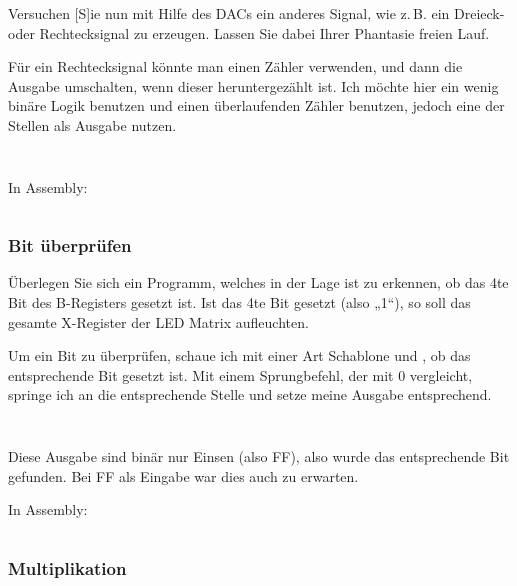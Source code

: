\begin{problem}
	Versuchen [S]ie nun mit Hilfe des DACs ein anderes Signal, wie z.\,B. ein
	Dreieck- oder Rechtecksignal zu erzeugen. Lassen Sie dabei Ihrer Phantasie
	freien Lauf.
\end{problem}

Für ein Rechtecksignal könnte man einen Zähler verwenden, und dann die Ausgabe
umschalten, wenn dieser heruntergezählt ist. Ich möchte hier ein wenig binäre
Logik benutzen und einen überlaufenden Zähler benutzen, jedoch eine der Stellen
als Ausgabe nutzen.

\inputminted[fontsize=\small, linenos]{cpp}{../Prototypen/e.cpp}

\begin{multicols}{9}
	\inputminted[fontsize=\footnotesize]{text}{e.txt}
\end{multicols}

In Assembly:

\inputminted[fontsize=\small, linenos]{python}{../Assembly/e.s}

\subsubsection{Bit überprüfen}

\begin{problem}
	Überlegen Sie sich ein Programm, welches in der Lage ist zu erkennen, ob
	das 4te Bit des B-Registers gesetzt ist. Ist das 4te Bit gesetzt (also
	„1“), so soll das gesamte X-Register der LED Matrix aufleuchten.
\end{problem}

Um ein Bit zu überprüfen, schaue ich mit einer Art Schablone und \txor, ob das
entsprechende Bit gesetzt ist. Mit einem Sprungbefehl, der mit 0 vergleicht,
springe ich an die entsprechende Stelle und setze meine Ausgabe entsprechend.

\inputminted[fontsize=\small, linenos]{cpp}{../Prototypen/f.cpp}

\begin{multicols}{9}
	\inputminted[fontsize=\footnotesize]{text}{f.txt}
\end{multicols}

Diese Ausgabe sind binär nur Einsen (also FF), also wurde das entsprechende Bit
gefunden. Bei FF als Eingabe war dies auch zu erwarten.

In Assembly:

\inputminted[fontsize=\small, linenos]{python}{../Assembly/f.s}
\subsubsection{Multiplikation}

